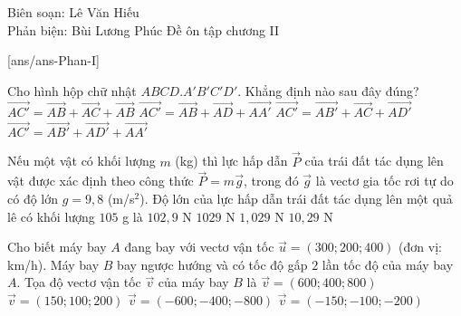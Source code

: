 ﻿\begin{name}
 {Biên soạn: Lê Văn Hiếu\\Phản biện: Bùi Lương Phúc}
{Đề ôn tập chương II}
\end{name}

\TN
{}[ans/ans\currfilebase-Phan-I]
\begin{ex}%
 Cho hình hộp chữ nhật $ABCD.A'B'C'D'$. Khẳng định nào sau đây đúng?
 \choice
 {$\overrightarrow{AC'}=\overrightarrow{AB}+\overrightarrow{AC}+\overrightarrow{AB}$}
 {\True $\overrightarrow{AC'}=\overrightarrow{AB}+\overrightarrow{AD}+\overrightarrow{AA'}$}
 {$\overrightarrow{AC'}=\overrightarrow{AB'}+\overrightarrow{AC}+\overrightarrow{AD'}$}
 {$\overrightarrow{AC'}=\overrightarrow{AB'}+\overrightarrow{AD'}+\overrightarrow{AA'}$}
\end{ex}

\begin{ex}%
 Nếu một vật có khối lượng $m$ (kg) thì lực hấp dẫn $\overrightarrow{P}$ của trái đất tác dụng lên vật được xác định theo công thức $\overrightarrow P=m\overrightarrow g$, trong đó $\overrightarrow g$ là vectơ gia tốc rơi tự do có độ lớn $g=9{,}8$ (m/s$^2$). Độ lớn của lực hấp dẫn trái đất tác dụng lên một quả lê có khối lượng $105$ g là
 \choice
 {$102{,}9$ N}
 {$1029$ N}
 {\True $1{,}029$ N}
 {$10{,}29$ N}
\end{ex}

\begin{ex}%
 Cho biết máy bay $A$ đang bay với vectơ vận tốc $\overrightarrow u=( 300;200;400)$ (đơn vị: km/h). Máy bay $B$ bay ngược hướng và có tốc độ gấp $2$ lần tốc độ của máy bay $A$. Tọa độ vectơ vận tốc $\overrightarrow v$ của máy bay $B$ là
 \choice
 {$\overrightarrow v=(600;400;800)$}
 {$\overrightarrow v=(150;100;200)$}
 {\True $\overrightarrow v=(-600;-400;-800)$}
 {$\overrightarrow v=(-150;-100;-200)$}
 \end{ex}

